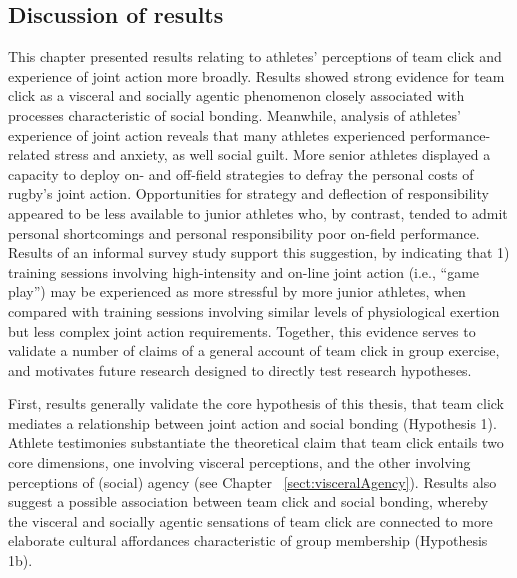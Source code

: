 \begin{CJK}{UTF8}{gbsn}
\section{Discussion of results}
This chapter presented results relating to athletes' perceptions of team click and experience of joint action more broadly.  Results showed strong evidence for team click as a visceral and socially agentic phenomenon closely associated with processes characteristic of social bonding.  Meanwhile, analysis of athletes' experience of joint action reveals that many athletes experienced performance-related stress and anxiety, as well social guilt.  More senior athletes displayed a capacity to deploy on- and off-field strategies to defray the personal costs of rugby's joint action.  Opportunities for strategy and deflection of responsibility appeared to be less available to junior athletes who, by contrast, tended to admit personal shortcomings and personal responsibility poor on-field performance.  Results of an informal survey study support this suggestion, by indicating that 1) training sessions involving high-intensity and on-line joint action (i.e., ``game play'')  may be experienced as more stressful by more junior athletes, when compared with training sessions involving similar levels of physiological exertion but less complex joint action requirements. Together, this evidence serves to validate a number of claims of a general account of team click in group exercise, and motivates future research designed to directly test research hypotheses.

First, results generally validate the core hypothesis of this thesis, that team click mediates a relationship between joint action and social bonding (Hypothesis 1).  Athlete testimonies substantiate the theoretical claim that team click entails two core dimensions, one involving visceral perceptions, and the other involving perceptions of (social) agency (see Chapter ~\ref{sect:visceralAgency}).  Results also suggest a possible association between team click and social bonding, whereby the visceral and socially agentic sensations of team click are connected to more elaborate cultural affordances characteristic of group membership (Hypothesis 1b).


\end{CJK}
